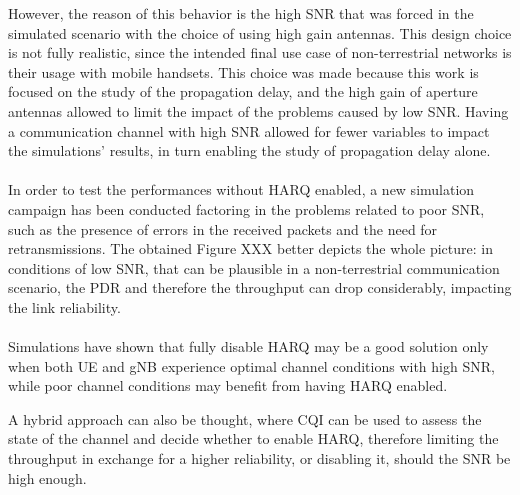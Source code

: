 However, the reason of this behavior is the high \ac{SNR} that was forced in the simulated scenario with the choice of using high gain antennas. This design choice is not fully realistic, since the intended final use case of non-terrestrial networks is their usage with mobile handsets. This choice was made because this work is focused on the study of the propagation delay, and the high gain of aperture antennas allowed to limit the impact of the problems caused by low \ac{SNR}. Having a communication channel with high \ac{SNR} allowed for fewer variables to impact the simulations' results, in turn enabling the study of propagation delay alone.

\paragraph{}
In order to test the performances without \ac{HARQ} enabled, a new simulation campaign has been conducted factoring in the problems related to poor \ac{SNR}, such as the presence of errors in the received packets and the need for retransmissions. The obtained Figure XXX better depicts the whole picture: in conditions of low \ac{SNR}, that can be plausible in a non-terrestrial communication scenario, the \ac{PDR} and therefore the throughput can drop considerably, impacting the link reliability.
\paragraph{}
Simulations have shown that fully disable \ac{HARQ} may be a good solution only when both \ac{UE} and \ac{gNB} experience optimal channel conditions with high \ac{SNR}, while poor channel conditions may benefit from having \ac{HARQ} enabled.

A hybrid approach can also be thought, where \ac{CQI} can be used to assess the state of the channel and decide whether to enable \ac{HARQ}, therefore limiting the throughput in exchange for a higher reliability, or disabling it, should the \ac{SNR} be high enough.


